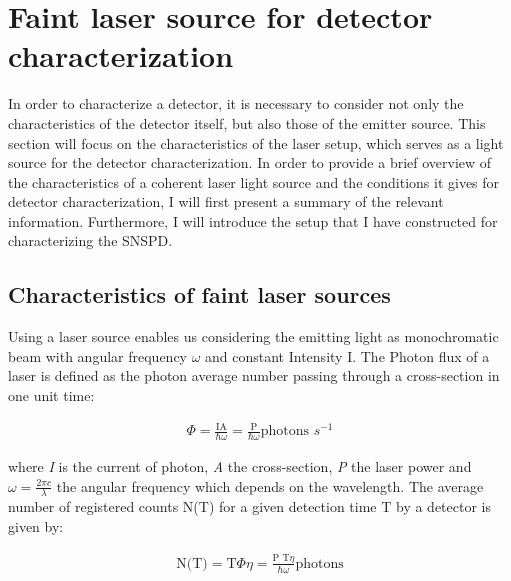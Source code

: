 
\chapter{Faint laser source for detector characterization}
\label{sec:SNSPD_setup}

In order to characterize a detector, it is necessary to consider not only the characteristics of the detector itself,
but also those of the emitter source.
This section will focus on the characteristics of the laser setup, which serves as a light source for the detector
characterization.
In order to provide a brief overview of the characteristics of a coherent laser light source and the conditions it gives
for detector characterization, I will first present a summary of the relevant information.
Furthermore, I will introduce the setup that I have constructed for characterizing the SNSPD.


\section{Characteristics of faint laser sources}\label{sec:characteristics_faint laser sources}


Using a laser source enables us considering the emitting light as monochromatic beam with angular frequency $\omega$
and constant Intensity I. The Photon flux of a laser is defined as the photon average number passing through
a cross-section in one unit time:

\begin{align}
    \Phi = \frac{\text{I} \text{A}}{\hbar \omega} = \frac{\text{P}}{\hbar \omega} \text{photons $s^{-1}$}
\end{align}

where \textit{I} is the current of photon, \textit{A} the cross-section, \textit{P} the laser power and $\omega = \frac{2 \pi c}{\lambda}$ the angular frequency which
depends on the wavelength.
The average number of registered counts N(T) for a given detection time T by a detector is given by:

\begin{align}
    \text{N(T)} = \text{T} \Phi \eta= \frac{\text{P T} \eta}{\hbar \omega} \text{photons}
\end{align}

